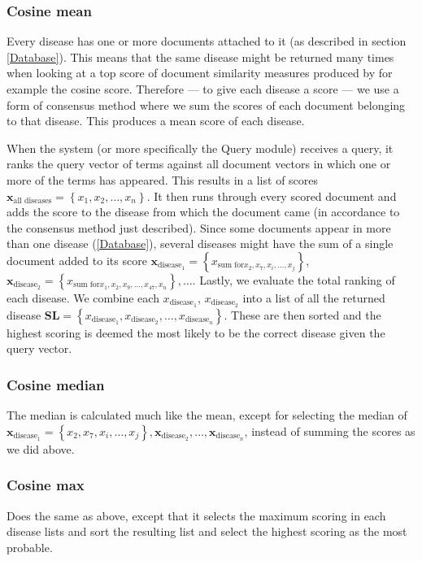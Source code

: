 \subsubsection{Cosine mean}
Every disease has one or more documents attached to it (as described
in section \ref{Database}). This means that the same disease might be
returned many times when looking at a top score of document similarity
measures produced by for example the cosine score. Therefore --- to
give each disease a score --- we use a form of consensus method where
we sum the scores of each document belonging to that disease. This
produces a mean score of each disease.

When the system (or more specifically the Query module) receives a
query, it ranks the query vector of terms against all document vectors
in which one or more of the terms has appeared. This results in a list
of scores $\mathbf{x}_{\textrm{all diseases}} = \left\{x_1, x_2,
\dots, x_n \right\}$. It then runs through every scored document and
adds the score to the disease from which the document came (in
accordance to the consensus method just described). Since some
documents appear in more than one disease (\ref{Database}), several
diseases might have the sum of a single document added to its score
$\mathbf{x}_{\textrm{disease}_{1}} = \left\{x_{\textrm{sum for} x_2,
  x_7, x_i, \dots, x_j}\right\}$, $\mathbf{x}_{\textrm{disease}_{2}} =
\left\{x_{\textrm{sum for} x_1, x_2, x_9, \dots, x_47, x_n}\right\},
\dots$. Lastly, we evaluate the total ranking of each disease. We
combine each $x_{\textrm{disease}_1}$, $x_{\textrm{disease}_2}$ into a
list of all the returned disease $\mathbf{SL} =
\left\{x_{\textrm{disease}_1},x_{\textrm{disease}_2}, \dots,
x_{\textrm{disease}_n}\right\}$. These are then sorted and the highest
scoring is deemed the most likely to be the correct disease given the
query vector.

\subsubsection{Cosine median}
The median is calculated much like the mean, except for selecting the
median of $\mathbf{x}_{\textrm{disease}_{1}} = \left\{x_2,x_7, x_i,
\dots, x_j\right\}, \mathbf{x}_{\textrm{disease}_{2}}, \dots,
\mathbf{x}_{\textrm{disease}_{n}}$, instead of summing the scores as
we did above.

\subsubsection{Cosine max}
Does the same as above, except that it selects the maximum scoring in each
disease lists and sort the resulting list and select the highest
scoring as the most probable.

